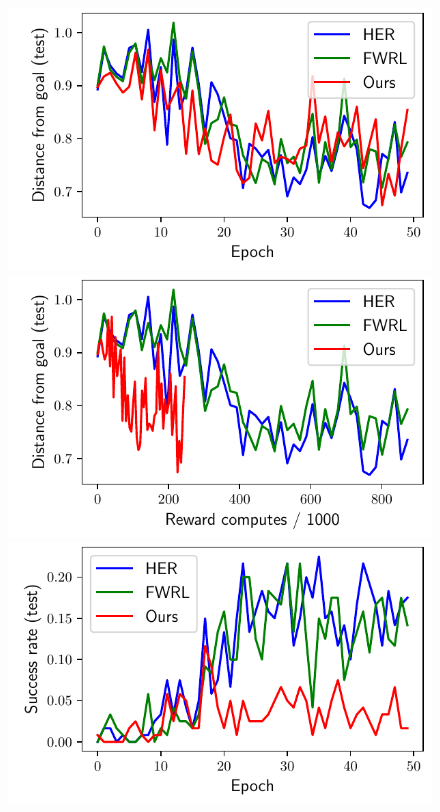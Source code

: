 \begin{figure}
  \includegraphics[width=\frac\columnwidth]{media/res/6efc1de-path_reward_low_thresh_chosen-HandManipulatePenRotate-v0-ddpg/epoch-test/ag_g_dist.pdf}%
  \includegraphics[width=\frac\columnwidth]{media/res/6efc1de-path_reward_low_thresh_chosen-HandManipulatePenRotate-v0-ddpg/reward_computes-test/ag_g_dist.pdf}%
  \includegraphics[width=\frac\columnwidth]{media/res/6efc1de-path_reward_low_thresh_chosen-HandManipulatePenRotate-v0-ddpg/epoch-test/success_rate.pdf}%

\end{figure}
